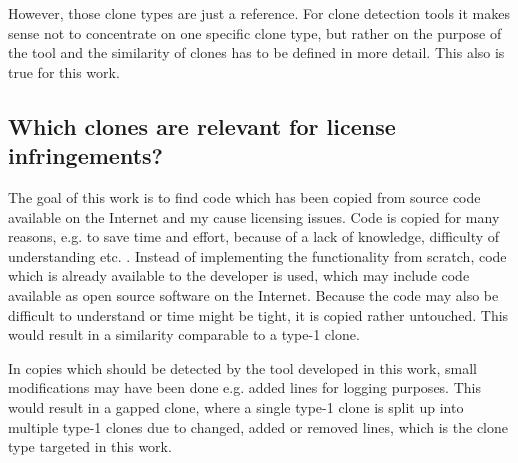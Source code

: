 However, those clone types are just a reference.
For clone detection tools it makes sense not to concentrate on one specific clone type, but rather on the purpose of the tool and the similarity of clones has to be defined in more detail.
This also is true for this work.
 
\subsection*{Which clones are relevant for license infringements?}
The goal of this work is to find code which has been copied from source code available on the Internet and my cause licensing issues.
Code is copied for many reasons, e.g. to save time and effort, because of a lack of knowledge, difficulty of understanding etc. \cite{roy2007survey}.
Instead of implementing the functionality from scratch, code which is already available to the developer is used, which may include code available as open source software on the Internet.
Because the code may also be difficult to understand or time might be tight, it is copied rather untouched.
This would result in a similarity comparable to a type-1 clone.

In copies which should be detected by the tool developed in this work, small modifications may have been done e.g. added lines for logging purposes.
This would result in a gapped clone, where a single type-1 clone is split up into multiple type-1 clones due to changed, added or removed lines, which is the clone type targeted in this work.